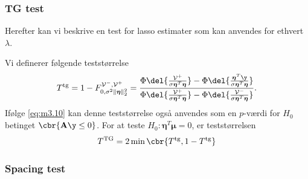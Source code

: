 \subsubsection{TG test}
Herefter kan vi beskrive en test for lasso estimater som kan anvendes for ethvert \(\lambda\).

Vi definerer følgende teststørrelse
\begin{align*}
T^{\text{tg}}=1- F_{0, \sigma^2 \Vert \boldsymbol{\eta} \Vert_2^2}^{\mathcal{V}^-, \mathcal{V}^+} = \frac{\Phi \del{\frac{\mathcal{V}^+}{\sigma  \boldsymbol{\eta}^T  \boldsymbol{\eta}}}-\Phi \del{\frac{\boldsymbol{\eta}^T \y}{\sigma  \boldsymbol{\eta}^T  \boldsymbol{\eta}}}}{\Phi \del{\frac{\mathcal{V}^+}{\sigma  \boldsymbol{\eta}^T  \boldsymbol{\eta}}}-\Phi \del{\frac{\mathcal{V}^-}{\sigma  \boldsymbol{\eta}^T  \boldsymbol{\eta}}}}.
\end{align*}
Ifølge \eqref{eq:m3.10} kan denne teststørrelse også anvendes som en \(p\)-værdi for \(H_0\) betinget \(\cbr{\mathbf{A} \y \leq 0}\).
For at teste \(H_0: \boldsymbol{\eta}^T \boldsymbol{\mu}=0\), er teststørrelsen
\begin{align*}
T^{\text{TG}}= 2 \min \cbr{T^{\text{tg}}, 1-T^{\text{tg}}}
\end{align*}

\subsubsection{Spacing test}